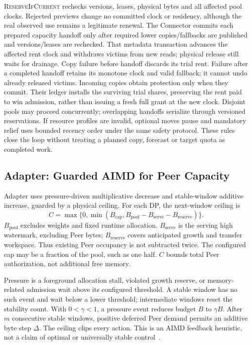 \textsc{ReserveIfCurrent} rechecks versions, leases, physical bytes and
all affected pool clocks. Rejected previews change no committed clock
or residency, although the real observed use remains a legitimate renewal.
The Connector commits each prepared capacity handoff only after required
lower copies/fallbacks are published and versions/leases are rechecked.
That metadata transaction advances
the affected rent clock and withdraws victims from new reads; physical
release still waits for drainage. Copy failure before handoff discards
its trial rent. Failure after a completed handoff retains its monotone
clock and valid fallback; it cannot undo already released victims.
Incoming copies obtain protection only when they commit. Their ledger
installs the surviving trial shares, preserving the rent paid to win
admission, rather than issuing a fresh full grant at the new clock.
Disjoint pools may proceed concurrently; overlapping handoffs serialize
through versioned reservations. If resource profiles are invalid,
optional moves pause and mandatory relief uses bounded recency order
under the same safety protocol. These rules close the loop without
treating a planned copy, forecast or target quota as completed work.

\subsection{Adapter: Guarded AIMD for Peer Capacity}
\label{sec:adapter}

Adapter uses pressure-driven multiplicative decrease and stable-window
additive increase, guarded by a physical ceiling. For each DP, the next-window ceiling is
\begin{equation}
 C=\max\{0,\min(B_{\mathrm{cap}},
       B_{\mathrm{pool}}-B_{\mathrm{serve}}-B_{\mathrm{reserve}})\}.
 \label{eq:peer-ceiling}
\end{equation}
$B_{\mathrm{pool}}$ excludes weights and fixed runtime allocation.
$B_{\mathrm{serve}}$ is the serving high watermark, excluding Peer bytes;
$B_{\mathrm{reserve}}$ covers anticipated growth and transfer workspace.
Thus existing Peer occupancy is not subtracted twice. The configured cap
may be a fraction of the pool, such as one half. $C$ bounds total Peer
authorization, not additional free memory.

Pressure is a foreground allocation stall, violated growth reserve, or
memory-related admission wait above its configured threshold. A stable
window has no such event and wait below a lower threshold; intermediate
windows reset the stability count. With $0<\gamma<1$, a pressure event
reduces budget $B$ to $\gamma B$. After $m$ consecutive stable windows,
positive deferred Peer demand permits an additive byte step $\Delta$.
The ceiling clips every action. This is an AIMD feedback heuristic,
not a claim of optimal or universally stable control~\cite{chiu1989aimd}.

